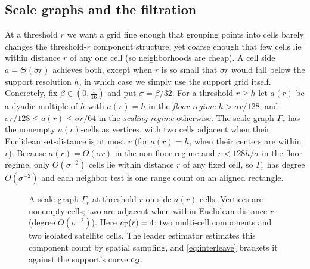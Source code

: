 \subsection{Scale graphs and the filtration}\label{sec:support-filtration}

At a threshold $r$ we want a grid fine enough that grouping points into cells barely changes the
threshold-$r$ component structure, yet coarse enough that few cells lie within distance $r$ of any one cell
(so neighborhoods are cheap). A cell side $a=\Theta(\sigma r)$ achieves both, except when $r$ is so small
that $\sigma r$ would fall below the support resolution $h$, in which case we simply use the support grid
itself. Concretely, fix $\beta\in(0,\tfrac1{16})$ and put $\sigma=\beta/32$. For a threshold $r\ge h$ let
$a(r)$ be a dyadic multiple of $h$ with $a(r)=h$ in the \emph{floor regime} $h>\sigma r/128$, and
$\sigma r/128\le a(r)\le\sigma r/64$ in the \emph{scaling regime} otherwise. The scale graph $\Gamma_r$ has
the nonempty $a(r)$-cells as vertices, with two cells adjacent when their Euclidean set-distance is at most
$r$ (for $a(r)=h$, when their centers are within $r$). Because
$a(r)=\Theta(\sigma r)$ in the non-floor regime and $r<128h/\sigma$ in the floor regime, only
$O(\sigma^{-2})$ cells lie within distance $r$ of any fixed cell, so $\Gamma_r$ has degree
$O(\sigma^{-2})$ and each neighbor test is one range count on an aligned rectangle.

\begin{figure}[t]
\centering
{}
\caption{A scale graph $\Gamma_r$ at threshold $r$ on side-$a(r)$ cells. Vertices are nonempty cells;
two are adjacent when within Euclidean distance $r$ (degree $O(\sigma^{-2})$). Here $c_\Gamma(r)=4$: two
multi-cell components and two isolated satellite cells. The leader estimator estimates this component
count by spatial sampling, and \eqref{eq:interleave} brackets it against the support's curve $c_Q$.}
\label{fig:scalegraph}
\end{figure}

